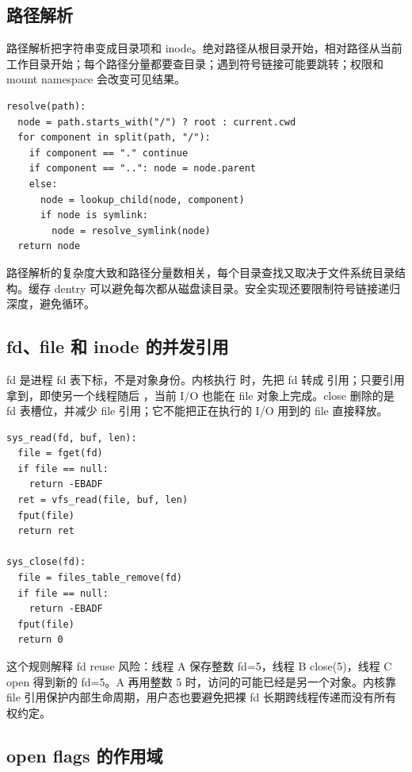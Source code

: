 \subsection{路径解析}

路径解析把字符串变成目录项和 inode。绝对路径从根目录开始，相对路径从当前工作目录开始；每个路径分量都要查目录；遇到符号链接可能要跳转；权限和 mount namespace 会改变可见结果。

\begin{lstlisting}
resolve(path):
  node = path.starts_with("/") ? root : current.cwd
  for component in split(path, "/"):
    if component == "." continue
    if component == "..": node = node.parent
    else:
      node = lookup_child(node, component)
      if node is symlink:
        node = resolve_symlink(node)
  return node
\end{lstlisting}

路径解析的复杂度大致和路径分量数相关，每个目录查找又取决于文件系统目录结构。缓存 dentry 可以避免每次都从磁盘读目录。安全实现还要限制符号链接递归深度，避免循环。

\subsection{fd、file 和 inode 的并发引用}

fd 是进程 fd 表下标，不是对象身份。内核执行  时，先把 fd 转成  引用；只要引用拿到，即使另一个线程随后 ，当前 I/O 也能在 file 对象上完成。close 删除的是 fd 表槽位，并减少 file 引用；它不能把正在执行的 I/O 用到的 file 直接释放。

\begin{lstlisting}
sys_read(fd, buf, len):
  file = fget(fd)
  if file == null:
    return -EBADF
  ret = vfs_read(file, buf, len)
  fput(file)
  return ret

sys_close(fd):
  file = files_table_remove(fd)
  if file == null:
    return -EBADF
  fput(file)
  return 0
\end{lstlisting}

这个规则解释 fd reuse 风险：线程 A 保存整数 fd=5，线程 B close(5)，线程 C open 得到新的 fd=5。A 再用整数 5 时，访问的可能已经是另一个对象。内核靠 file 引用保护内部生命周期，用户态也要避免把裸 fd 长期跨线程传递而没有所有权约定。

\subsection{open flags 的作用域}

